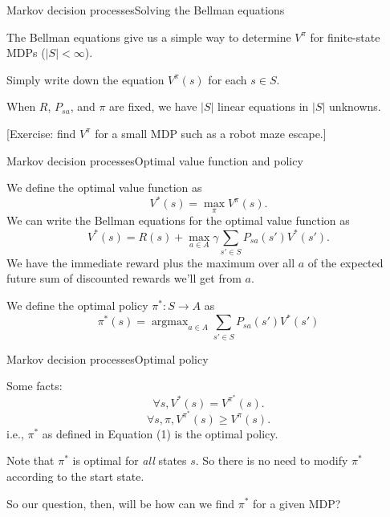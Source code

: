 \documentclass{beamer}
\DeclareMathOperator*{\argmax}{argmax}
\begin{document}
\begin{frame}{Markov decision processes}{Solving the Bellman equations}

  The Bellman equations give us a simple way to determine $V^\pi$ for
  finite-state MDPs ($|S| < \infty$).

  \medskip

  Simply write down the equation $V^\pi(s)$ for each $s\in S$.

  \medskip

  When $R$, $P_{sa}$, and $\pi$ are fixed, we have $|S|$ linear
  equations in $|S|$ unknowns.

  \medskip

  [Exercise: find $V^\pi$ for a small MDP such as a robot maze escape.]
  
\end{frame}


\begin{frame}{Markov decision processes}{Optimal value function and policy}

  We define the \alert{optimal value function} as
  \[ V^*(s) = \max_\pi V^\pi(s) .\]
  We can write the Bellman equations for the optimal value function as
  \[ V^*(s) = R(s) + \max_{a\in A}\gamma\sum_{s'\in S}P_{sa}(s')V^*(s') .\]
  We have the immediate reward plus the maximum over all $a$ of the
  expected future sum of discounted rewards we'll get from $a$.

  \medskip

  We define the \alert{optimal policy} $\pi^* : S \rightarrow A$ as
  \begin{equation}
    \label{optpol}
    \pi^*(s) = \argmax_{a \in A} \sum_{s'\in S} P_{sa}(s')V^*(s')
  \end{equation}
  
\end{frame}


\begin{frame}{Markov decision processes}{Optimal policy}

  Some facts:
  \[ \forall s, V^*(s) = V^{\pi^*}(s). \]
  \[ \forall s, \pi, V^{\pi^*}(s) \ge V^\pi(s). \]
  i.e., $\pi^*$ as defined in Equation (1) is the optimal policy.

  \medskip

  Note that $\pi^*$ is optimal for \textit{all} states $s$.
  So there is no need to modify $\pi^*$ according to the start state.

  \medskip

  So our question, then, will be
  \alert{how can we find $\pi^*$ for a given MDP?}

\end{frame}
\end{document}
